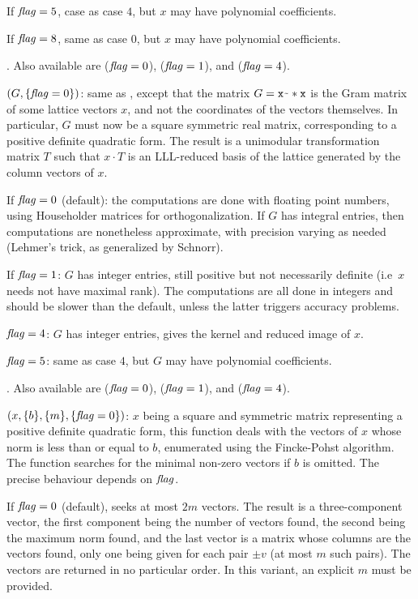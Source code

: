 If $\hbox{\it f\kern0pt lag\/}=5$, case as case $4$, but $x$ may have polynomial coefficients.

If $\hbox{\it f\kern0pt lag\/}=8$, same as case $0$, but $x$ may have polynomial coefficients.

. Also available are
 ($\hbox{\it f\kern0pt lag\/}=0$),  ($\hbox{\it f\kern0pt lag\/}=1$), and
 ($\hbox{\it f\kern0pt lag\/}=4$).

$(G,\{\hbox{\it f\kern0pt lag\/}=0\})$: same as , except that the
matrix $G = \kbd{x\til * x}$ is the Gram matrix of some lattice vectors $x$,
and not the coordinates of the vectors themselves. In particular, $G$ must
now be a square symmetric real matrix, corresponding to a positive definite
quadratic form. The result is a unimodular transformation matrix $T$ such
that $x \cdot T$ is an LLL-reduced basis of the lattice generated by the
column vectors of $x$.

If $\hbox{\it f\kern0pt lag\/}=0$ (default): the computations are done with floating point numbers,
using Householder matrices for orthogonalization. If $G$ has integral
entries, then computations are nonetheless approximate, with precision
varying as needed (Lehmer's trick, as generalized by Schnorr).

If $\hbox{\it f\kern0pt lag\/}=1$: $G$ has integer entries, still positive but not necessarily
definite (i.e~$x$ needs not have maximal rank). The computations are all
done in integers and should be slower than the default, unless the latter
triggers accuracy problems.

$\hbox{\it f\kern0pt lag\/}=4$: $G$ has integer entries, gives the kernel and reduced image of $x$.

$\hbox{\it f\kern0pt lag\/}=5$: same as case $4$, but $G$ may have polynomial coefficients.

. Also available are
 ($\hbox{\it f\kern0pt lag\/}=0$),  ($\hbox{\it f\kern0pt lag\/}=1$), and
 ($\hbox{\it f\kern0pt lag\/}=4$).

$(x,\{b\},\{m\},\{\hbox{\it f\kern0pt lag\/}=0\})$: $x$ being a square and symmetric
matrix representing a positive definite quadratic form, this function
deals with the vectors of $x$ whose norm is less than or equal to $b$,
enumerated using the Fincke-Pohst algorithm. The function searches for
the minimal non-zero vectors if $b$ is omitted. The precise behaviour
depends on $\hbox{\it f\kern0pt lag\/}$.

If $\hbox{\it f\kern0pt lag\/}=0$ (default), seeks at most $2m$ vectors. The result is a
three-component vector, the first component being the number of vectors
found, the second being the maximum norm found, and the last vector is a
matrix whose columns are the vectors found, only one being given for each
pair $\pm v$ (at most $m$ such pairs). The vectors are returned in no
particular order. In this variant, an explicit $m$ must be provided.

